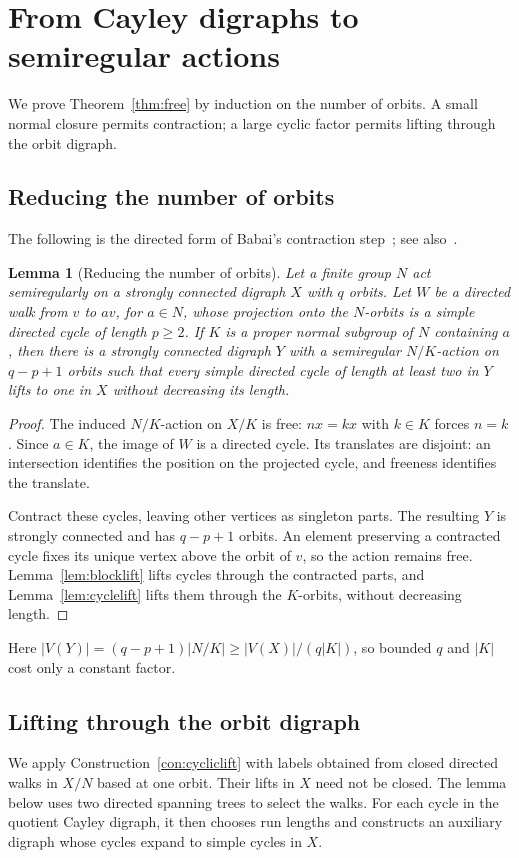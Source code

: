 \documentclass[11pt,a4paper,reqno]{amsart}
\newtheorem{lemma}[theorem]{Lemma}
\theoremstyle{definition}
\theoremstyle{remark}
\numberwithin{equation}{section}
\begin{document}
\section{From Cayley digraphs to semiregular actions}\label{sec:returns}\label{sec:free}
We prove Theorem~\ref{thm:free} by induction on the number of orbits. A small normal closure permits contraction; a large cyclic factor permits lifting through the orbit digraph.

\subsection{Reducing the number of orbits}
The following is the directed form of Babai's contraction step~\cite{BabaiContractions}; see also~\cite[Theorem 7.2]{LiMethuku}.

\begin{lemma}[Reducing the number of orbits]\label{lem:free-reduction}
Let a finite group $N$ act semiregularly on a strongly connected digraph $X$ with $q$ orbits. Let $W$ be a directed walk from $v$ to $av$, for $a\in N$, whose projection onto the $N$-orbits is a simple directed cycle of length $p\ge2$. If $K$ is a proper normal subgroup of $N$ containing $a$, then there is a strongly connected digraph $Y$ with a semiregular $N/K$-action on $q-p+1$ orbits such that every simple directed cycle of length at least two in $Y$ lifts to one in $X$ without decreasing its length.
\end{lemma}
\begin{proof}
The induced $N/K$-action on $X/K$ is free: $nx=kx$ with $k\in K$ forces $n=k$. Since $a\in K$, the image of $W$ is a directed cycle. Its translates are disjoint: an intersection identifies the position on the projected cycle, and freeness identifies the translate.

Contract these cycles, leaving other vertices as singleton parts. The resulting $Y$ is strongly connected and has $q-p+1$ orbits. An element preserving a contracted cycle fixes its unique vertex above the orbit of $v$, so the action remains free. Lemma~\ref{lem:blocklift} lifts cycles through the contracted parts, and Lemma~\ref{lem:cyclelift} lifts them through the $K$-orbits, without decreasing length.
\end{proof}

Here $|V(Y)|=(q-p+1)|N/K|\ge |V(X)|/(q|K|)$, so bounded $q$ and $|K|$ cost only a constant factor.


\subsection{Lifting through the orbit digraph}
We apply Construction~\ref{con:cycliclift} with labels obtained from closed directed walks in $X/N$ based at one orbit. Their lifts in $X$ need not be closed. The lemma below uses two directed spanning trees to select the walks. For each cycle in the quotient Cayley digraph, it then chooses run lengths and constructs an auxiliary digraph whose cycles expand to simple cycles in $X$.
\end{document}
